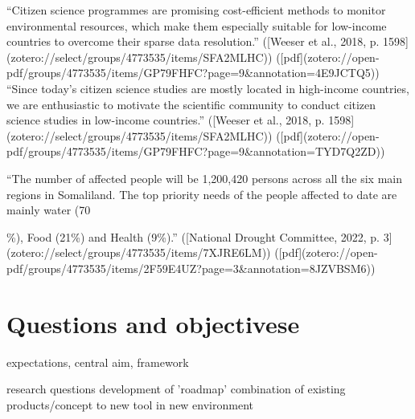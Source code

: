 “Citizen science programmes are promising cost-efficient methods to monitor environmental resources, which make them especially suitable for low-income countries to overcome their sparse data resolution.” ([Weeser et al., 2018, p. 1598](zotero://select/groups/4773535/items/SFA2MLHC)) ([pdf](zotero://open-pdf/groups/4773535/items/GP79FHFC?page=9&annotation=4E9JCTQ5))
“Since today's citizen science studies are mostly located in high-income countries, we are enthusiastic to motivate the scientific community to conduct citizen science studies in low-income countries.” ([Weeser et al., 2018, p. 1598](zotero://select/groups/4773535/items/SFA2MLHC)) ([pdf](zotero://open-pdf/groups/4773535/items/GP79FHFC?page=9&annotation=TYD7Q2ZD))

“The number of affected people will be 1,200,420 persons across all the six main regions in Somaliland. The top priority needs of the people affected to date are mainly water (70{\%), Food (21\%) and Health (9\%).” ([National Drought Committee, 2022, p. 3](zotero://select/groups/4773535/items/7XJRE6LM)) ([pdf](zotero://open-pdf/groups/4773535/items/2F59E4UZ?page=3&annotation=8JZVBSM6))



\section{Questions and objectivese}
expectations, central aim, framework



research questions
development of 'roadmap'
combination of existing products/concept to new tool in new environment




}
